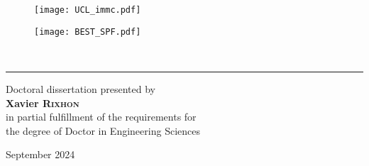 \begin{titlingpage}

\begin{figure}[!t]
\begin{minipage}[m]{.46\textwidth}
\flushleft
\texttt{[image: UCL\_immc.pdf]}
\end{minipage}
\hfill
\begin{minipage}[m]{.40\textwidth}
\flushright
\vspace{-0.25cm}
\texttt{[image: BEST\_SPF.pdf]}
\end{minipage}
\vspace{3 cm}
\end{figure}

\vspace{2 cm}


\begin{flushright}
\vspace{0.2cm}
{\fontsize{16}{20}\selectfont \mytitle\\[1em]
{\fontsize{14}{16}\selectfont \mysubtitle}}
\end{flushright}

\begin{flushright}
\rule{0.75\linewidth}{0.2mm}
\end{flushright}

\begin{flushright}
\vspace{1 cm}
\begin{small}
Doctoral dissertation presented by\\
\vspace{0.1cm}
{\Large \textbf{Xavier \textsc{Rixhon}}}\\
\vspace{0.1cm}
in partial fulfillment of the requirements for\\
the degree of Doctor in Engineering Sciences\\[1em]%
\end{small}
\end{flushright}

\begin{flushright}
\begin{small}
September 2024\\%
\end{small}
\end{flushright}



\end{titlingpage}
